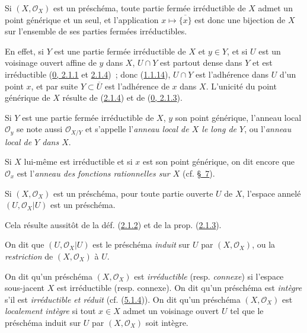 \begin{proposition}[2.1.5]
\label{I.2.1.5-fr}
Si $(X,\mathscr{O}_X)$ est un préschéma, toute partie fermée irréductible de
$X$ admet un point générique et un seul, et l'application
$x\longmapsto\overline{\{x\}}$ est donc une bijection de $X$ sur l'ensemble
de ses parties fermées irréductibles.
\end{proposition}

En effet, si $Y$ est une partie fermée irréductible de $X$ et $y\in Y$, et si
$U$ est un voisinage ouvert affine de $y$ dans $X$, $U\cap Y$ est partout
dense dans $Y$ et est irréductible
(\hyperref[0.2.1.1-fr]{0, 2.1.1} et
\hyperref[0.2.1.4-fr]{2.1.4})~; donc
(\hyperref[I.1.1.14-fr]{1.1.14}), $U\cap Y$ est l'adhérence dans $U$ d'un
point $x$, et par suite $Y\subset\overline{U}$ est l'adhérence de $x$ dans
$X$. L'unicité du point générique de $X$ résulte de
(\hyperref[I.2.1.4-fr]{2.1.4}) et de
(\hyperref[0.2.1.3-fr]{0, 2.1.3}).

\begin{env}[2.1.6]
\label{I.2.1.6-fr}
Si $Y$ est une partie fermée irréductible de $X$, $y$ son point générique,
l'anneau local $\mathscr{O}_y$ se note aussi $\mathscr{O}_{X/Y}$ et s'appelle
l'\emph{anneau local de $X$ le long de $Y$}, ou l'\emph{anneau local de $Y$
dans $X$}.

Si $X$ lui-même est irréductible et si $x$ est son point générique, on dit
encore que $\mathscr{O}_x$ est l'\emph{anneau des fonctions rationnelles sur
$X$} (cf. \hyperref[section:I.7-fr]{§~7}).
\end{env}

\begin{proposition}[2.1.7]
\label{I.2.1.7-fr}
Si $(X,\mathscr{O}_X)$ est un préschéma, pour toute partie ouverte $U$ de $X$,
l'espace annelé $(U,\mathscr{O}_X|U)$ est un préschéma.
\end{proposition}

Cela résulte aussitôt de la déf. (\hyperref[I.2.1.2-fr]{2.1.2}) et de la prop.
(\hyperref[I.2.1.3-fr]{2.1.3}).

On dit que $(U,\mathscr{O}_X|U)$ est le préschéma \emph{induit} sur $U$ par
$(X,\mathscr{O}_X)$, ou la \emph{restriction} de $(X,\mathscr{O}_X)$ à $U$.

\begin{env}[2.1.8]
\label{I.2.1.8-fr}
On dit qu'un préschéma $(X,\mathscr{O}_X)$ est \emph{irréductible} (resp.
\emph{connexe}) si l'espace sous-jacent $X$ est irréductible (resp. connexe).
On dit qu'un préschéma est \emph{intègre} s'il est \emph{irréductible et
réduit} (cf. (\hyperref[I.5.1.4-fr]{5.1.4})). On dit qu'un préschéma
$(X,\mathscr{O}_X)$ est \emph{localement intègre} si tout $x\in X$ admet un
voisinage ouvert $U$ tel que le préschéma induit sur $U$ par
$(X,\mathscr{O}_X)$ soit intègre.
\end{env}

